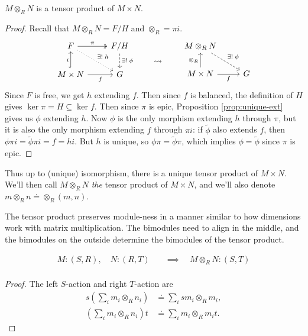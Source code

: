 \documentclass[twoside,10pt]{report}
\begin{document}
\begin{thrm}[Existence]
$M \otimes_{R}N$ is a tensor product of $M \times N$.
\end{thrm}
\begin{proof}
	Recall that $M \otimes_{R}N =F/H$ and $\otimes_{R} = \pi i$.
	\begin{equation*}
        \begin{aligned}[c]
        	\begin{tikzcd}
			F \rar[two heads]{\pi} \arrow[dr,dotted,"\exists!\;h"] & F/H \dar[dashed]{\exists!\;\phi} \\
			M\times N \uar[hook]{i}\rar["f"'] & G
		\end{tikzcd}
        \end{aligned}
        \qquad\leadsto\qquad
        \begin{aligned}[c]
                \begin{tikzcd}
			M \otimes_{R} N \arrow[dr,dashed,"\exists!\;\phi"] \\
			M\times N \uar{\otimes_{R}} \rar["f"'] & G
                \end{tikzcd}
        \end{aligned}
        \end{equation*}
	Since $F$ is free, we get $h$ extending $f$. Then since $f$ is balanced, the definition of $H$ gives $\ker \pi=H \subseteq \ker f$. Then since $\pi$ is epic, Proposition \ref{prop:unique-ext} gives us $\phi$ extending $h$. Now $\phi$ is the only morphism extending $h$ through $\pi$, but it is also the only morphism extending $f$ through $\pi i$: if $\tilde{\phi}$ also extends $f$, then $\phi \pi i = \tilde{\phi}\pi i = f = hi$. But $h$ is unique, so $\phi \pi=\tilde{\phi}\pi$, which implies $\phi=\tilde{\phi}$ since $\pi$ is epic.
\end{proof}

\begin{note}[]
	Thus up to (unique) isomorphism, there is a unique tensor product of $M \times N$. We'll then call $M \otimes_{R}N$ \textit{the} tensor product of $M \times N$, and we'll also denote $m \otimes_{R}n \doteq \otimes_{R}(m,n)$.
\end{note}

The tensor product preserves module-ness in a manner similar to how dimensions work with matrix multiplication. The bimodules need to align in the middle, and the bimodules on the outside determine the bimodules of the tensor product.

\begin{prop}
	\begin{align*}
		M:(S,R), \quad N:(R,T) &\quad\implies\quad M\otimes_{R}N:(S,T) \\
	\end{align*}
\end{prop}
\begin{proof}
	The left $S$-action and right $T$-action are
	\begin{align*}
		s \left( \sum_i m_i \otimes_{R}n_i \right) &\doteq \sum_i sm_i \otimes_{R}m_i, \\
		\left( \sum_i m_i \otimes_{R}n_i \right) t &\doteq \sum_i m_i \otimes_{R}m_i t.
	\end{align*}
\end{proof}
\end{document}
